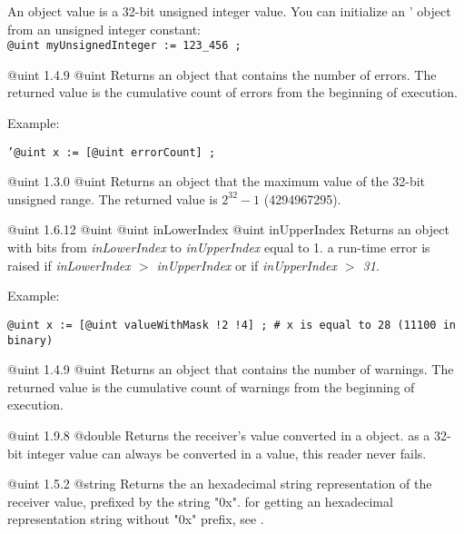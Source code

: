 
An  object value is a 32-bit unsigned integer value. You can initialize an ' object from an unsigned integer constant:\\

\texttt{@uint myUnsignedInteger := 123\_456 ;}


{@uint}
{1.4.9}
{@uint}
{Returns an  object that contains the number of errors.}
{The returned value is the cumulative count of errors from the beginning of execution.}

Example:

\texttt{'@uint x := [@uint errorCount] ;}

{@uint}
{1.3.0}
{@uint}
{Returns an  object that the maximum value of the 32-bit unsigned range.}
{The returned value is $2^{32}-1$ (4294967295).}


{@uint}
{1.6.12}
{@uint}
{@uint inLowerIndex}
{@uint inUpperIndex}
{Returns an  object with bits from \emph{inLowerIndex} to \emph{inUpperIndex} equal to 1.}
{a run-time error is raised if \emph{inLowerIndex $>$ inUpperIndex} or if \emph{inUpperIndex $>$ 31}.}


Example:

\texttt{@uint x := [@uint valueWithMask !2 !4] ; \# x is equal to 28 (11100 in binary)}





{@uint}
{1.4.9}
{@uint}
{Returns an  object that contains the number of warnings.}
{The returned value is the cumulative count of warnings from the beginning of execution.}



{@uint}
{1.9.8}
{@double}
{Returns the receiver's value converted in a  object.}
{as a 32-bit integer value can always be converted in a  value, this reader never fails.}



{@uint}
{1.5.2}
{@string}
{Returns the an hexadecimal string representation of the receiver value, prefixed by the string "0x".}
{for getting an hexadecimal representation string without "0x" prefix, see .}



